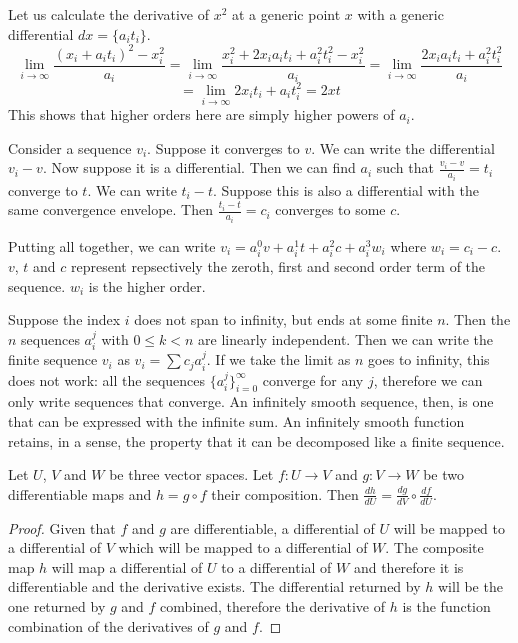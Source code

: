 \begin{remark}
	Let us calculate the derivative of $x^2$ at a generic point $x$ with a generic differential $dx = \{a_i t_i\}$.
	$$ \lim\limits_{i \to \infty} \frac{(x_i + a_i t_i)^2 - x_i^2}{a_i} = \lim\limits_{i \to \infty} \frac{x_i^2 + 2 x_i a_i t_i + a_i^2t_i^2 - x_i^2}{a_i} = \lim\limits_{i \to \infty} \frac{2 x_i a_i t_i + a_i^2t_i^2}{a_i}$$
	$$= \lim\limits_{i \to \infty} 2 x_i t_i + a_i t_i^2=2xt$$
	This shows that higher orders here are simply higher powers of $a_i$.
\end{remark}

\begin{remark}
	Consider a sequence $v_i$. Suppose it converges to $v$. We can write the differential $v_i - v$. Now suppose it is a differential. Then we can find $a_i$ such that $\frac{v_i - v}{a_i} = t_i$ converge to $t$. We can write $t_i - t$. Suppose this is also a differential with the same convergence envelope. Then $\frac{t_i - t}{a_i} = c_i$ converges to some $c$.
	
	Putting all together, we can write $v_i = a_i^0 v + a_i^1 t + a_i^2 c + a_i^3 w_i$ where $w_i = c_i - c$. $v$, $t$ and $c$ represent repsectively the zeroth, first and second order term of the sequence. $w_i$ is the higher order.
	
	Suppose the index $i$ does not span to infinity, but ends at some finite $n$. Then the $n$ sequences $a_i^j$ with $0 \leq k < n$ are linearly independent. Then we can write the finite sequence $v_i$ as $v_i = \sum c_j a_i^j$. If we take the limit as $n$ goes to infinity, this does not work: all the sequences $\{a_i^j\}_{i=0}^\infty$ converge for any $j$, therefore we can only write sequences that converge. An infinitely smooth sequence, then, is one that can be expressed with the infinite sum. An infinitely smooth function retains, in a sense, the property that it can be decomposed like a finite sequence.
\end{remark}


\begin{prop}
	Let $U$, $V$ and $W$ be three vector spaces. Let $f : U \to V$ and $g : V \to W$ be two differentiable maps and $h = g \circ f$ their composition. Then $\frac{dh}{dU} = \frac{dg}{dV} \circ \frac{df}{dU}$.
\end{prop}

\begin{proof}
	Given that $f$ and $g$ are differentiable, a differential of $U$ will be mapped to a differential of $V$ which will be mapped to a differential of $W$. The composite map $h$ will map a differential of $U$ to a differential of $W$ and therefore it is differentiable and the derivative exists. The differential returned by $h$ will be the one returned by $g$ and $f$ combined, therefore the derivative of $h$ is the function combination of the derivatives of $g$ and $f$.
\end{proof}

